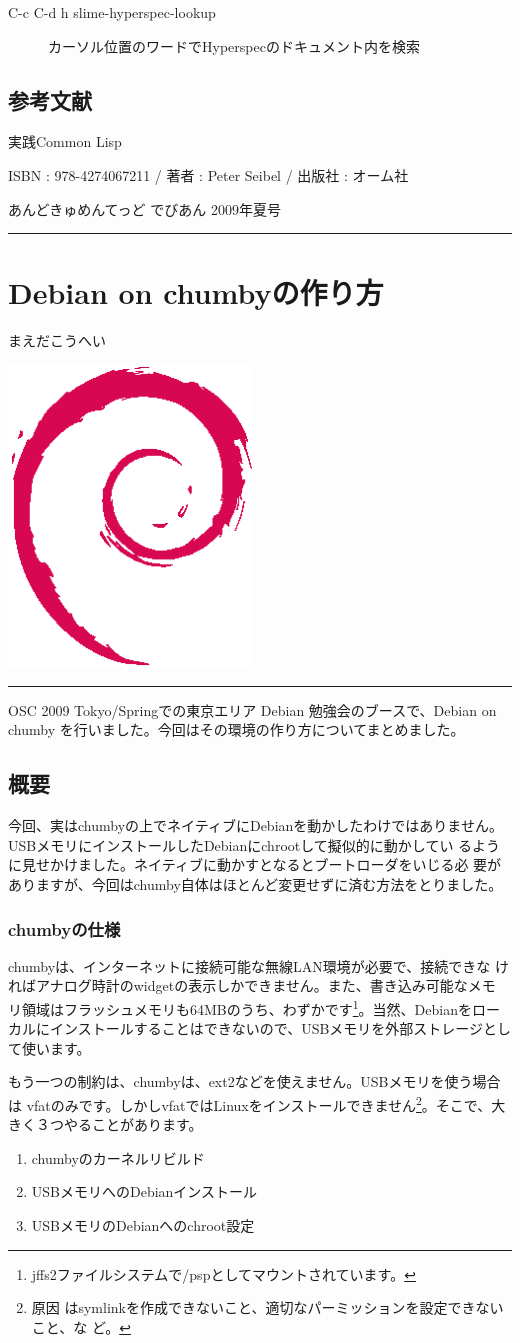 \documentclass[mingoth,a4paper]{jsarticle}
\renewcommand{\dancersection}[2]{%
\newpage
あんどきゅめんてっど でびあん 2009年夏号
%
\vspace{0.1mm}\\
{\color{dancerlightblue}\rule{\hsize}{2mm}}

%
%
\begin{minipage}[t]{0.6\hsize}
\color{dancerdarkblue}
\vspace{1cm}
\section{#1}
\hfill{}#2\\
\end{minipage}
\begin{minipage}[t]{0.4\hsize}
\vspace{-2cm}
\hfill{}\includegraphics[height=8cm]{image200502/openlogo-nd.eps}\\
\vspace{-5cm}
\end{minipage}
%
%
{\color{dancerdarkblue}\rule{0.74\hsize}{2mm}}
%
\vspace{2cm}
}
\begin{document}
\begin{description}
\item[C-c C-d h  slime-hyperspec-lookup]     カーソル位置のワードでHyperspecのドキュメント内を検索
\end{description}

\subsection{参考文献}
実践Common Lisp

ISBN : 978-4274067211 / 著者 : Peter Seibel / 出版社 : オーム社

\dancersection{Debian on chumbyの作り方 }{まえだこうへい}

OSC 2009 Tokyo/Springでの東京エリア Debian 勉強会のブースで、Debian on
chumby を行いました。今回はその環境の作り方についてまとめました。
\subsection{概要}
今回、実はchumbyの上でネイティブにDebianを動かしたわけではありません。
USBメモリにインストールしたDebianにchrootして擬似的に動かしてい
るように見せかけました。ネイティブに動かすとなるとブートローダをいじる必
要がありますが、今回はchumby自体はほとんど変更せずに済む方法をとりました。

\subsubsection{chumbyの仕様}
chumbyは、インターネットに接続可能な無線LAN環境が必要で、接続できな
ければアナログ時計のwidgetの表示しかできません。また、書き込み可能なメモ
リ領域はフラッシュメモリも64MBのうち、わずかです\footnote{jffs2ファイルシステムで/pspとしてマウントされています。}。当然、Debianをローカルにインストールすることはできないので、USBメモリを外部ストレージとして使います。

もう一つの制約は、chumbyは、ext2などを使えません。USBメモリを使う場合は
vfatのみです。しかしvfatではLinuxをインストールできません\footnote{原因
はsymlinkを作成できないこと、適切なパーミッションを設定できないこと、な
ど。}。そこで、大きく３つやることがあります。
\begin{enumerate}
\item chumbyのカーネルリビルド
\item USBメモリへのDebianインストール
\item USBメモリのDebianへのchroot設定
\end{enumerate}
\end{document}
